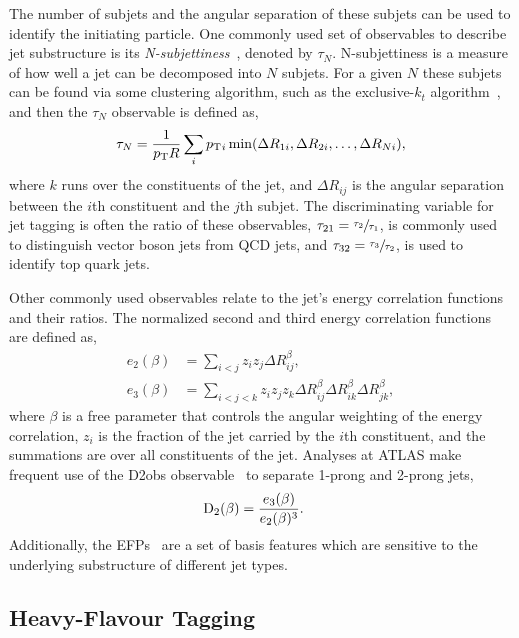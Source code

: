 The number of subjets and the angular separation of these subjets can be used to identify the initiating particle.
One commonly used set of observables to describe jet substructure is its \emph{N-subjettiness}~\cite{Subjet}, denoted by ${\tau_N}$.
N-subjettiness is a measure of how well a jet can be decomposed into $N$ subjets.
For a given $N$ these subjets can be found via some clustering algorithm, such as the exclusive-$k_t$ algorithm~\cite{ExclusiveKT}, and then the $\tau_N$ observable is defined as,
\begin{equation}
    \tau_N = \frac{1}{p_\mathrm{T} R} \sum_{i} p_\mathrm{T}{_i}
    \min(\Delta R_{1i}, \Delta R_{2i}, \ldots, \Delta R_{Ni}),
\end{equation}
where $k$ runs over the constituents of the jet, and $\Delta R_{ij}$ is the angular separation between the $i$th constituent and the $j$th subjet.
The discriminating variable for jet tagging is often the ratio of these observables, $\tau_{21} = \sfrac{\tau_2}{\tau_1}$, is commonly used to distinguish vector boson jets from QCD jets, and
$\tau_{32} = \sfrac{\tau_3}{\tau_2}$, is used to identify top quark jets.

Other commonly used observables relate to the jet's energy correlation functions~\cite{ECF} and their ratios.
The normalized second and third energy correlation functions are defined as,
\begin{align}
    e_{2}(\beta) & = \sum_{i < j} z_i z_j \Delta R_{ij}^\beta,                                                       \\
    e_{3}(\beta) & = \sum_{i < j < k} z{_i} z{_j} z{_k} \Delta R_{ij}^\beta \Delta R_{ik}^\beta \Delta R_{jk}^\beta,
\end{align}
where $\beta$ is a free parameter that controls the angular weighting of the energy correlation, $z_i$ is the \pt fraction of the jet carried by the $i$th constituent, and the summations are over all constituents of the jet.
Analyses at ATLAS make frequent use of the \Gls{D2obs} observable~\cite{ATLASD2} to separate 1-prong and 2-prong jets,
\begin{align}
    \text{D}_2(\beta) & = \frac{e_3(\beta)}{e_2(\beta)^3}.
\end{align}
Additionally, the \Gls{EFPs}~\cite{EFP} are a set of basis features which are sensitive to the underlying substructure of different jet types.

\subsection{Heavy-Flavour Tagging}
\label{sec:flavour_tagging}

